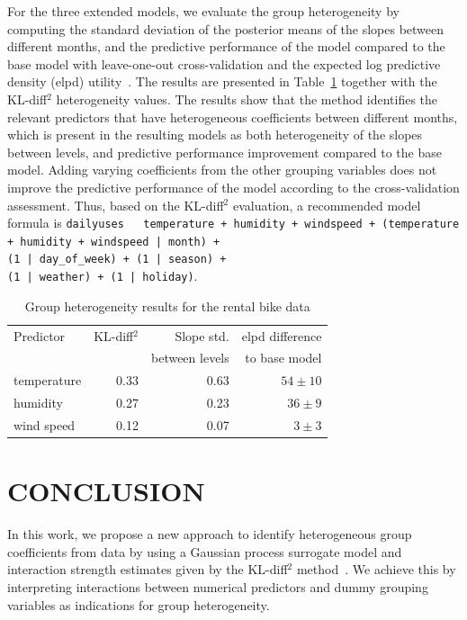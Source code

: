 \documentclass{article}
\begin{document}
For the three extended models, we
evaluate the group heterogeneity by computing the standard deviation of the posterior means of the slopes between different months, and the predictive performance of the model compared to the base model with leave-one-out cross-validation and the expected log predictive density (elpd) utility~\cite{Vehtari+Gelman+Gabry:2017_practical}.
The results are presented in Table~\ref{tab:bikedata} together with the
KL-diff$^2$ heterogeneity values. The results show that the method
identifies the relevant predictors that have heterogeneous coefficients
between different months, which is present in the resulting
models as both heterogeneity of the slopes between levels, and predictive performance improvement
compared to the base model.
%
%
%
Adding varying coefficients from the other grouping variables does not improve
the predictive performance of the model according to the cross-validation assessment.
Thus, based on the KL-diff$^2$ evaluation, a recommended model formula is
\texttt{dailyuses \texttildelow \, temperature + humidity + windspeed + (temperature + humidity + windspeed | month) + \\ (1 | day\_of\_week) + (1 | season) + \\ (1 | weather) + (1 | holiday)}.
%



\begin{table}[tbp]
  \centering
  \caption{Group heterogeneity results for the rental bike data}
  \begin{tabular}[tbp]{lrrr}
    \toprule
    Predictor & KL-diff$^2$ & Slope std. & elpd difference\\
    & & between levels & to base model \\
    \midrule
    temperature  & 0.33 & 0.63 & $54 \pm 10$ \\
    humidity     & 0.27 & 0.23 & $36 \pm 9$ \\
    wind speed   & 0.12 & 0.07 & $3 \pm 3$ \\
    \bottomrule
  \end{tabular}
  \label{tab:bikedata}
\end{table}






\section{CONCLUSION}
\label{sec:conclusion}

In this work, we propose a new approach to identify heterogeneous group coefficients from data by using a Gaussian process surrogate model and interaction strength estimates given by the KL-diff$^2$ method~\cite{paananen2019ranking}.
%
We achieve this by interpreting interactions between numerical predictors and dummy grouping variables as indications for group heterogeneity.
\end{document}
